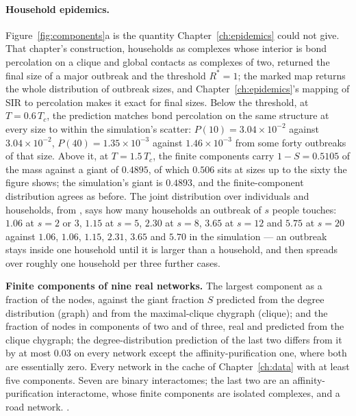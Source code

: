 \paragraph{Household epidemics.} Figure~\ref{fig:components}a is the
quantity Chapter~\ref{ch:epidemics} could not give. That chapter's
construction, households as complexes whose interior is bond percolation on
a clique and global contacts as complexes of two, returned the final size
of a major outbreak and the threshold $R^{*}=1$; the marked map returns the
whole distribution of outbreak sizes, and Chapter~\ref{ch:epidemics}'s
mapping of SIR to percolation makes it exact for final sizes. Below the
threshold, at $T=0.6\,T_{c}$, the prediction matches bond percolation on
the same structure at every size to within the simulation's scatter:
$P(10)=3.04\times10^{-2}$ against $3.04\times10^{-2}$, $P(40)=1.35\times10^{-3}$
against $1.46\times10^{-3}$ from some forty outbreaks of that size. Above it,
at $T=1.5\,T_{c}$, the finite components carry $1-S=0.5105$ of the mass
against a giant of $0.4895$, of which $0.506$ sits at sizes up to the
sixty the figure shows; the simulation's giant is $0.4893$, and the
finite-component distribution agrees as before. The joint distribution
over individuals and households, from , says how many
households an outbreak of $s$ people touches: $1.06$ at $s=2$ or $3$,
$1.15$ at $s=5$, $2.30$ at $s=8$, $3.65$ at $s=12$ and $5.75$ at $s=20$
against $1.06$, $1.06$, $1.15$, $2.31$, $3.65$ and $5.70$ in the
simulation --- an outbreak stays inside one household until it is larger
than a household, and then spreads over roughly one household per three
further cases.

\begin{table}[t]
\centering\small
\begin{adjustbox}{max width=\linewidth}

\end{adjustbox}
\caption{\textbf{Finite components of nine real networks.} The largest
component as a fraction of the nodes, against the giant fraction $S$
predicted from the degree distribution (graph) and from the maximal-clique
chygraph (clique); and the fraction of nodes in components of two and of
three, real and predicted from the clique chygraph; the degree-distribution
prediction of the last two differs from it by at most $0.03$ on every
network except the affinity-purification one, where both are essentially
zero. Every network in the cache of
Chapter~\ref{ch:data} with at least five components. Seven are binary
interactomes; the last two are an affinity-purification interactome, whose
finite components are isolated complexes, and a road network.
.}
\label{tab:components}
\end{table}

